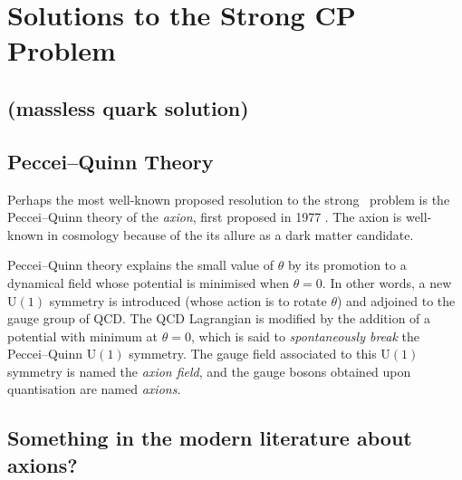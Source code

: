 \chapter{Solutions to the Strong CP Problem}

\section{(massless quark solution)}

\section{Peccei--Quinn Theory}

Perhaps the most well-known proposed resolution to the strong \CP\ problem is the Peccei--Quinn theory of the \emph{axion}, first proposed in 1977 \cite{PecceiQuinn_1977}.
The axion is well-known in cosmology because of the its allure as a dark matter candidate.

Peccei--Quinn theory explains the small value of $\theta$ by its promotion to a dynamical field whose potential is minimised when $\theta = 0$.
In other words, a new $\mathrm{U}(1)$ symmetry is introduced (whose action is to rotate $\theta$) and adjoined to the gauge group of QCD.
The QCD Lagrangian is modified by the addition of a potential with minimum at $\theta = 0$, which is said to \emph{spontaneously break} the Peccei--Quinn $\mathrm{U}(1)$ symmetry.
The gauge field associated to this $\mathrm{U}(1)$ symmetry is named the \emph{axion field}, and the gauge bosons obtained upon quantisation are named \emph{axions}.


\section{Something in the modern literature about axions?}